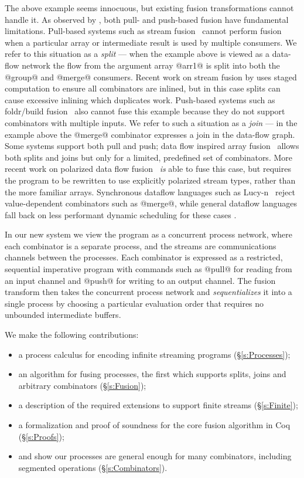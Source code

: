 The above example seems innocuous, but existing fusion transformations cannot handle it.
As observed by \citet{kay2009you}, both pull- and push-based fusion have fundamental limitations.
Pull-based systems such as stream fusion~\cite{coutts2007stream} cannot perform fusion when a particular array or intermediate result is used by multiple consumers.
We refer to this situation as a \emph{split} --- when the example above is viewed as a data-flow network the flow from the argument array @arr1@ is split into both the @group@ and @merge@ consumers.
Recent work on stream fusion by \citet{kiselyov2016stream} uses staged computation to ensure all combinators are inlined, but in this case splits can cause excessive inlining which duplicates work.
Push-based systems such as foldr/build fusion~\cite{gill1993short} also cannot fuse this example because they do not support combinators with multiple inputs.
We refer to such a situation as a \emph{join} --- in the example above the @merge@ combinator expresses a join in the data-flow graph.
Some systems support both pull and push; data flow inspired array fusion~\cite{lippmeier2013data} allows both splits and joins but only for a limited, predefined set of combinators.
More recent work on polarized data flow fusion~\cite{lippmeier2016polarized} \emph{is} able to fuse this case, but requires the program to be rewritten to use explicitly polarized stream types, rather than the more familiar arrays.
Synchronous dataflow languages such as Lucy-n~\cite{mandel2010lucy} reject value-dependent combinators such as @merge@, while general dataflow languages fall back on less performant dynamic scheduling for these cases \cite{bouakaz2013real}.

In our new system we view the program as a concurrent process network, where each combinator is a separate process, and the streams are communications channels between the processes. Each combinator is expressed as a restricted, sequential imperative program with commands such as @pull@ for reading from an input channel and @push@ for writing to an output channel. The fusion transform then takes the concurrent process network and \emph{sequentializes} it into a single process by choosing a particular evaluation order that requires no unbounded intermediate buffers. 



We make the following contributions:
\begin{itemize}
\item a process calculus for encoding infinite streaming programs (\S\ref{s:Processes});
\item an algorithm for fusing processes, the first which supports splits, joins and arbitrary combinators (\S\ref{s:Fusion});
\item a description of the required extensions to support finite streams (\S\ref{s:Finite});
\item a formalization and proof of soundness for the core fusion algorithm in Coq (\S\ref{s:Proofs});
\item and show our processes are general enough for many combinators, including segmented operations (\S\ref{s:Combinators}).
\end{itemize}

